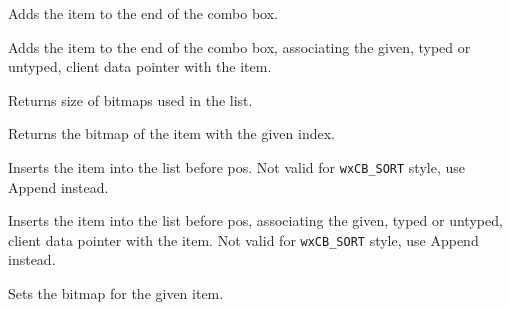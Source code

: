 Adds the item to the end of the combo box.



Adds the item to the end of the combo box, associating the given, typed or
untyped, client data pointer with the item.


\label{wxbitmapcomboboxgetbitmapsize}


Returns size of bitmaps used in the list.


\label{wxbitmapcomboboxgetitembitmap}


Returns the bitmap of the item with the given index.


\label{wxbitmapcomboboxinsert}


Inserts the item into the list before pos.
Not valid for {\tt wxCB\_SORT} style, use Append instead.



Inserts the item into the list before pos, associating the given, typed or
untyped, client data pointer with the item.
Not valid for {\tt wxCB\_SORT} style, use Append instead.


\label{wxbitmapcomboboxsetitembitmap}


Sets the bitmap for the given item.


